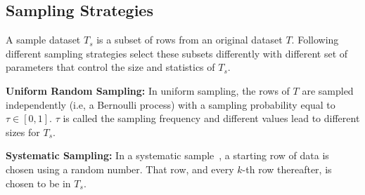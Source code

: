 

\subsection{Sampling Strategies}
\label{app:sampling_details}

A sample dataset $T_s$ is a subset of rows from an original dataset $T$. Following different sampling strategies select these subsets differently with different set of parameters that control the size and statistics of $T_s$.

\noindent \textbf{Uniform Random Sampling:}
In uniform sampling, the rows of $T$ are
sampled independently (i.e, a Bernoulli process) with a sampling probability equal to $\tau \in [0,1] $. $\tau$ is called the sampling frequency and different values lead to different sizes for $T_s$.

\noindent \textbf{Systematic Sampling:}
In a systematic sample~\cite{lohr2019sampling}, a starting row of data is chosen using a random number. That row, and every $k$-th row thereafter, is chosen to be in $T_s$.

